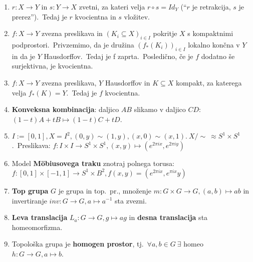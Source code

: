 \documentclass[10pt,a4paper]{article}
\begin{document}
\begin{enumerate}
\item  $r: X \rightarrow Y$ in $s: Y \rightarrow X$ zvetni, za
    kateri velja $r \circ  s = Id_Y$ (``$r$ je retrakcija, $s$ je prerez'').~Tedaj je $r$
    kvocientna in $s$ vložitev.
    
\item  $f : X \rightarrow Y$ zvezna preslikava in $(K_i \subseteq  X)_{i \in I}$ pokritje
    $X$ s kompaktnimi podprostori.~Privzemimo, da je družina $(f_*(K_i))_{i \in I}$
    lokalno končna v $Y$ in da je $Y$ Hausdorffov.~Tedaj je f zaprta.~Posledično,
    če je $f$ dodatno še surjektivna, je kvocientna.
    
\item  $f : X \rightarrow Y$ zvezna preslikava, $Y$ Hausdorffov in $K \subseteq X$
    kompakt, za katerega velja $f_*(K) = Y$.~Tedaj je $f$ kvocientna.
    
\item \textbf{Konveksna kombinacija}: daljico $AB$ slikamo v daljico $CD: $
    $(1-t)A + tB \mapsto (1-t)C + tD$.
    
\item $I := [0, 1], X = I^2, (0, y) \sim (1, y), (x, 0) \sim (x, 1).~X/\sim \
    \approx S^1 \times S^1$.~Preslikava: $f: I \times I \rightarrow S^1 \times S^1,
    (x, y) \mapsto (e^{2 \pi i x}, e^{2 \pi i y})$
    
\item Model \textbf{Möbiusovega traku} znotraj polnega torusa: $f: [0, 1] \times [-1, 1]
    \rightarrow S^1 \times B^2, f(x, y) = (e^{2 \pi i x}, e^{\pi i x}y)$
    
    
    
\item \textbf{Top grupa} $G$ je grupa in top.~pr., množenje $m: G \times
    G \rightarrow G, (a, b) \mapsto ab$ in invertiranje $inv: G \rightarrow G, a
    \mapsto a^{-1}$ sta zvezni.
    
\item \textbf{Leva translacija} $L_a : G \rightarrow G, g \mapsto ag$ in
    \textbf{desna translacija} sta homeomorfizma.
    
\item Topološka grupa je \textbf{homogen prostor}, tj.~$\forall a, b \in G \
    \exists$ homeo $h: G \rightarrow G, a \mapsto b$.
    

\end{enumerate}
\end{document}
